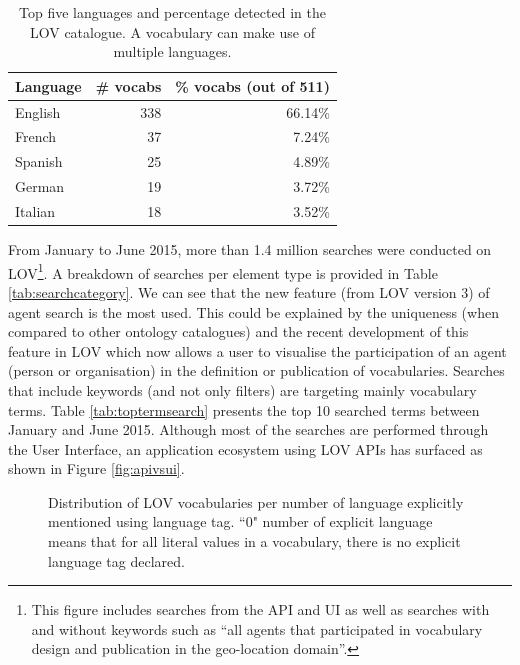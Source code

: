\documentclass{iosart2c}
\begin{document}
 \begin{table}[h!tb]
\caption{Top five languages and percentage detected in the LOV catalogue. A vocabulary can make use of multiple languages.}
\begin{tabular}{lrr}
\hline
\textbf{Language} & \textbf{\# vocabs} & \textbf{\% vocabs (out of 511)}  \\ \hline
English & 338 & 66.14\%      \\
French & 37 & 7.24\%      \\
Spanish & 25 & 4.89\%      \\
German & 19 & 3.72\%      \\
Italian & 18 & 3.52\%      \\
\hline  
\end{tabular}
\label{tab:language}
\end{table}


From January to June 2015, more than 1.4 million searches were conducted on LOV\footnote{This figure includes searches from the API and UI as well as searches with and without keywords such as ``all agents that participated in vocabulary design and publication in the geo-location domain''.}. A breakdown of searches per element type is provided in Table \ref{tab:searchcategory}. We can see that the new feature (from LOV version 3) of agent search is the most used. This could be explained by the uniqueness (when compared to other ontology catalogues) and the recent development of this feature in LOV  which now allows a user to visualise the participation of an agent (person or organisation) in the definition or publication of vocabularies. Searches that include keywords (and not only filters) are targeting mainly vocabulary terms. Table \ref{tab:toptermsearch} presents the top 10 searched terms between January and June 2015. Although most of the searches are performed through the User Interface, an application ecosystem using LOV APIs has surfaced as shown in Figure \ref{fig:apivsui}. 

\begin{figure}[htb]
\resizebox{\linewidth}{!}{}
\caption{\label{fig:langdist} Distribution of LOV vocabularies per number of language explicitly mentioned using language tag. ``0" number of explicit language means that for all literal values in a vocabulary, there is no explicit language tag declared.}
\end{figure}
\end{document}
